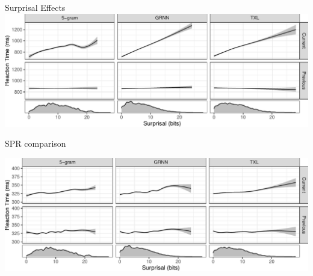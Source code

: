 \documentclass[12pt, xcolor=beamer,table,usenames,dvipsnames, ignorenonframetext, ngerman]{beamer}
\begin{document}
\begin{frame}{Surprisal Effects}
	\includegraphics[width=.9\textwidth]{../Images/amaze_gam.pdf}	
\end{frame}


\begin{frame}{SPR comparison}
	
	\includegraphics[width=\textwidth]{../Images/spr_gam.pdf}
	
\end{frame}
\end{document}
